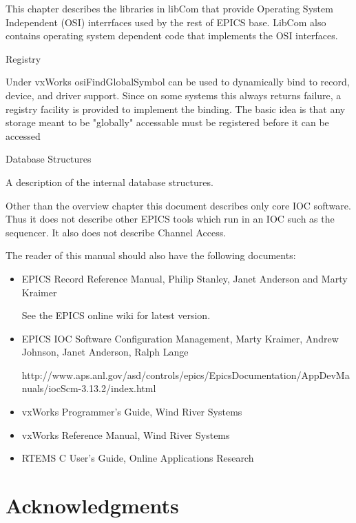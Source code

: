 \begin{description}\item This chapter describes the libraries in libCom that provide Operating System Independent (OSI) interrfaces used 
by the rest of EPICS base. LibCom also contains operating system dependent code that implements the OSI 
interfaces.

\end{description}Registry

\begin{description}\item Under vxWorks osiFindGlobalSymbol can be used to dynamically bind to record, device, and driver support. Since 
on some systems this always returns failure, a registry facility is provided to implement the binding. The basic idea 
is that any storage meant to be "globally" accessable must be registered before it can be accessed 

\end{description}Database Structures

\begin{description}\item A description of the internal database structures.

\end{description}Other than the overview chapter this document describes only core IOC software. Thus it does not describe other EPICS 
tools which run in an IOC such as the sequencer. It also does not describe Channel Access. 

The reader of this manual should also have the following documents:

\begin{itemize}\item EPICS Record Reference Manual, Philip Stanley, Janet Anderson and Marty Kraimer

See the EPICS online wiki for latest version.

\item EPICS IOC Software Configuration Management, Marty Kraimer, Andrew Johnson, Janet Anderson, Ralph Lange 

http://www.aps.anl.gov/asd/controls/epics/EpicsDocumentation/AppDevManuals/iocScm-3.13.2/index.html

\item vxWorks Programmer's Guide, Wind River Systems

\item vxWorks Reference Manual, Wind River Systems

\item RTEMS C User's Guide, Online Applications Research 

\end{itemize}\section{Acknowledgments}

